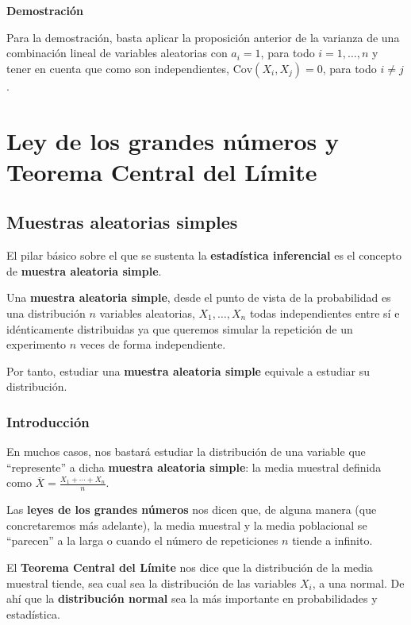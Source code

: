 \documentclass[]{book}
\begin{document}
\textbf{Demostración}

Para la demostración, basta aplicar la proposición anterior de la varianza de una combinación lineal de variables aleatorias con \(a_i=1\), para todo \(i=1,\ldots,n\) y tener en cuenta que como son independientes, \(\mathrm{Cov}(X_i,X_j)=0\), para todo \(i\neq j\).

\hypertarget{ley-de-los-grandes-nuxfameros-y-teorema-central-del-luxedmite}{%
\chapter{Ley de los grandes números y Teorema Central del Límite}\label{ley-de-los-grandes-nuxfameros-y-teorema-central-del-luxedmite}}

\hypertarget{muestras-aleatorias-simples}{%
\section{Muestras aleatorias simples}\label{muestras-aleatorias-simples}}

El pilar básico sobre el que se sustenta la \textbf{estadística inferencial} es el concepto de \textbf{muestra aleatoria simple}.

Una \textbf{muestra aleatoria simple}, desde el punto de vista de la probabilidad es una distribución \(n\) variables aleatorias, \(X_1,\ldots, X_n\) todas independientes entre sí e idénticamente distribuidas ya que queremos simular la repetición de un experimento \(n\) veces de forma independiente.

Por tanto, estudiar una \textbf{muestra aleatoria simple} equivale a estudiar su distribución.

\hypertarget{introducciuxf3n-13}{%
\subsection{Introducción}\label{introducciuxf3n-13}}

En muchos casos, nos bastará estudiar la distribución de una variable que ``represente'' a dicha \textbf{muestra aleatoria simple}: la media muestral definida como \(\overline{X}=\frac{X_1+\cdots + X_n}{n}\).

Las \textbf{leyes de los grandes números} nos dicen que, de alguna manera (que concretaremos más adelante), la media muestral y la media poblacional se ``parecen'' a la larga o cuando el número de repeticiones \(n\) tiende a infinito.

El \textbf{Teorema Central del Límite} nos dice que la distribución de la media muestral tiende, sea cual sea la distribución de las variables \(X_i\), a una normal. De ahí que la \textbf{distribución normal} sea la más importante en probabilidades y estadística.
\end{document}
